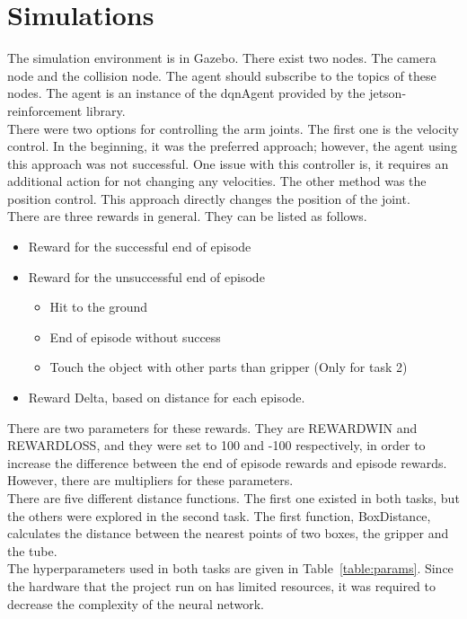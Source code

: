 \documentclass[10pt,journal,compsoc]{IEEEtran}
\begin{document}
\section{Simulations}
The simulation environment is in Gazebo. There exist two nodes. The camera node and the collision node. The agent should subscribe to the topics of these nodes. The agent is an instance of the dqnAgent provided by the jetson-reinforcement library.\\
There were two options for controlling the arm joints. The first one is the velocity control. In the beginning, it was the preferred approach; however, the agent using this approach was not successful. One issue with this controller is, it requires an additional action for not changing any velocities. The other method was the position control. This approach directly changes the position of the joint.\\
There are three rewards in general. They can be listed as follows.
\begin{itemize}
\item Reward for the successful end of episode
\item Reward for the unsuccessful end of episode
   \begin{itemize}
     \item Hit to the ground
     \item End of episode without success
     \item Touch the object with other parts than gripper (Only for task 2)
   \end{itemize}
\item Reward Delta, based on distance for each episode.
\end{itemize}
There are two parameters for these rewards. They are REWARD\textunderscore WIN and REWARD\textunderscore LOSS, and they were set to 100 and -100 respectively, in order to increase the difference between the end of episode rewards and episode rewards. However, there are multipliers for these parameters.\\
There are five different distance functions. The first one existed in both tasks, but the others were explored in the second task. The first function, BoxDistance, calculates the distance between the nearest points of two boxes, the gripper and the tube.\\
The hyperparameters used in both tasks are given in Table~\ref{table:params}. Since the hardware that the project run on has limited resources, it was required to decrease the complexity of the neural network.
\end{document}
